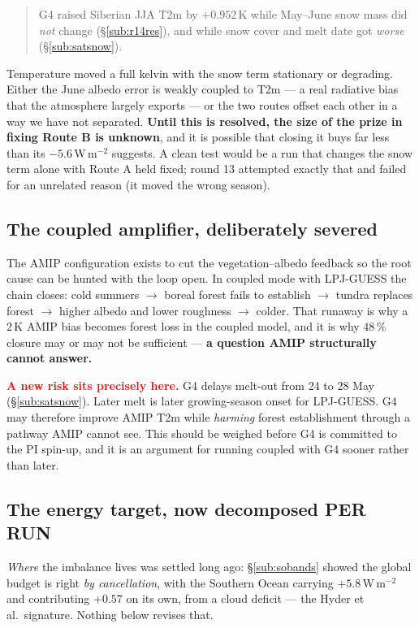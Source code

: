 \documentclass[10pt]{article}
\begin{document}
\begin{quote}
G4 raised Siberian JJA T2m by $+0.952$\,K while May--June snow mass did \emph{not}
change (\S\ref{sub:r14res}), and while snow cover and melt date got \emph{worse}
(\S\ref{sub:satsnow}).
\end{quote}

\noindent Temperature moved a full kelvin with the snow term stationary or degrading.
Either the June albedo error is weakly coupled to T2m --- a real radiative bias that the
atmosphere largely exports --- or the two routes offset each other in a way we have not
separated. \textbf{Until this is resolved, the size of the prize in fixing Route B is
unknown}, and it is possible that closing it buys far less than its $-5.6$\,W\,m$^{-2}$
suggests. A clean test would be a run that changes the snow term alone with Route A held
fixed; round 13 attempted exactly that and failed for an unrelated reason (it moved the
wrong season).

\subsection{The coupled amplifier, deliberately severed}\label{sub:amplifier}
The AMIP configuration exists to cut the vegetation--albedo feedback so the root cause can
be hunted with the loop open. In coupled mode with LPJ-GUESS the chain closes: cold summers
$\to$ boreal forest fails to establish $\to$ tundra replaces forest $\to$ higher albedo and
lower roughness $\to$ colder. That runaway is why a $2$\,K AMIP bias becomes forest loss in
the coupled model, and it is why $48\,\%$ closure may or may not be sufficient --- \textbf{a
question AMIP structurally cannot answer.}

\textcolor{red}{\textbf{A new risk sits precisely here.}} G4 delays melt-out from 24 to
28 May (\S\ref{sub:satsnow}). Later melt is later growing-season onset for LPJ-GUESS. G4
may therefore improve AMIP T2m while \emph{harming} forest establishment through a
pathway AMIP cannot see. This should be weighed before G4 is committed to the PI spin-up,
and it is an argument for running coupled with G4 sooner rather than later.

\subsection{The energy target, now decomposed PER RUN}\label{sub:toadecomp2}
\emph{Where} the imbalance lives was settled long ago: \S\ref{sub:sobands} showed the global
budget is right \emph{by cancellation}, with the Southern Ocean carrying $+5.8$\,W\,m$^{-2}$
and contributing $+0.57$ on its own, from a cloud deficit --- the Hyder et al.\ signature.
Nothing below revises that.
\end{document}
